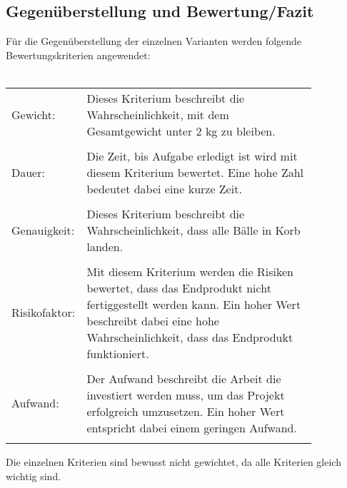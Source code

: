 

\clearpage

\subsection{Gegenüberstellung und Bewertung/Fazit}
Für die Gegenüberstellung der einzelnen Varianten werden folgende 
Bewertungskriterien angewendet: \\\\
\begin{tabular}{@{}p{0.10\linewidth}p{0.75\linewidth}}
    Gewicht:        &
        Dieses Kriterium beschreibt die Wahrscheinlichkeit, mit dem 
        Gesamtgewicht unter 2 kg zu bleiben. \\\\
    Dauer:          &
        Die Zeit, bis Aufgabe erledigt ist wird mit diesem Kriterium bewertet. 
        Eine hohe Zahl bedeutet dabei eine kurze Zeit.  \\\\
    Genauigkeit:    &
        Dieses Kriterium beschreibt die Wahrscheinlichkeit, dass alle Bälle in 
        Korb landen. \\\\
    Risikofaktor:   &
        Mit diesem Kriterium werden die Risiken bewertet, dass das Endprodukt 
        nicht fertiggestellt werden kann. Ein hoher Wert beschreibt dabei eine 
        hohe Wahrscheinlichkeit, dass das Endprodukt funktioniert. \\\\
    Aufwand:        &
        Der Aufwand beschreibt die Arbeit die investiert werden muss, um das 
        Projekt erfolgreich umzusetzen. Ein hoher Wert entspricht dabei einem 
        geringen Aufwand. \\\\
\end{tabular}

\noindent Die einzelnen Kriterien sind bewusst nicht gewichtet, da alle Kriterien gleich 
wichtig sind. 

